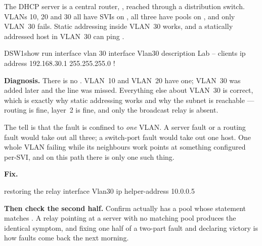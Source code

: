 \begin{breakfix}
The DHCP server is a central router, , reached through a distribution
switch. VLANs 10, 20 and 30 all have SVIs on , all three have pools on
, and only VLAN~30 fails. Static addressing inside VLAN~30 works, and a
statically addressed host in VLAN~30 can ping .

\begin{verify}{DSW1}{show run interface vlan 30}
interface Vlan30
 description Lab -- clients
 ip address 192.168.30.1 255.255.255.0
!
\end{verify}

\textbf{Diagnosis.} There is no . VLAN~10 and VLAN~20 have
one; VLAN~30 was added later and the line was missed. Everything else about
VLAN~30 is correct, which is exactly why static addressing works and why the
subnet is reachable --- routing is fine, layer~2 is fine, and only the broadcast
relay is absent.

The tell is that the fault is confined to \emph{one} VLAN. A server fault or a
routing fault would take out all three; a switch-port fault would take out one
host. One whole VLAN failing while its neighbours work points at something
configured per-SVI, and on this path there is only one such thing.

\textbf{Fix.}

\begin{config}{restoring the relay}
interface Vlan30
 ip helper-address 10.0.0.5
\end{config}

\textbf{Then check the second half.} Confirm  actually has a pool whose
 statement matches . A relay pointing at a
server with no matching pool produces the identical symptom, and fixing one half
of a two-part fault and declaring victory is how faults come back the next
morning.
\end{breakfix}

